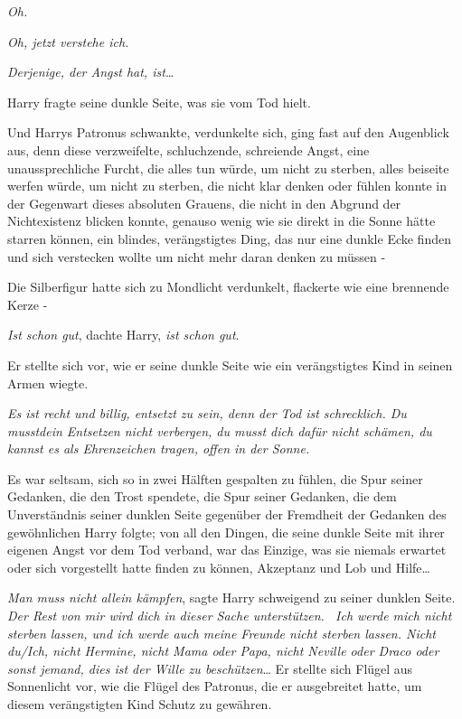 {\emph{\emph{Oh.}}

\emph{\emph{Oh, jetzt verstehe ich.}}

\emph{\emph{Derjenige, der Angst hat, ist…}}

Harry fragte seine dunkle Seite, was sie vom Tod hielt.

Und Harrys Patronus schwankte, verdunkelte sich, ging fast auf den Augenblick aus, denn diese verzweifelte, schluchzende, schreiende Angst, eine unaussprechliche Furcht, die alles tun würde, um nicht zu sterben, alles beiseite werfen würde, um nicht zu sterben, die nicht klar denken oder fühlen konnte in der Gegenwart dieses absoluten Grauens, die nicht in den Abgrund der Nichtexistenz blicken konnte, genauso wenig wie sie direkt in die Sonne hätte starren können, ein blindes, verängstigtes Ding, das nur eine dunkle Ecke finden und sich verstecken wollte um nicht mehr daran denken zu müssen -

Die Silberfigur hatte sich zu Mondlicht verdunkelt, flackerte wie eine brennende Kerze -

\emph{Ist schon gut}, dachte Harry, \emph{ist schon gut}.

Er stellte sich vor, wie er seine dunkle Seite wie ein verängstigtes Kind in seinen Armen wiegte.

\emph{\emph{Es ist recht und billig, entsetzt zu sein, denn der Tod ist schrecklich.} \emph{Du} \emph{musstdein Entsetzen nicht verbergen,} \emph{du musst dich dafür nicht schämen,} \emph{du kannst} \emph{es als Ehrenzeichen tragen, offen in der Sonne.}}

Es war seltsam, sich so in zwei Hälften gespalten zu fühlen, die Spur seiner Gedanken, die den Trost spendete, die Spur seiner Gedanken, die dem Unverständnis seiner dunklen Seite gegenüber der Fremdheit der Gedanken des gewöhnlichen Harry folgte; von all den Dingen, die seine dunkle Seite mit ihrer eigenen Angst vor dem Tod verband, war das Einzige, was sie niemals erwartet oder sich vorgestellt hatte finden zu können, Akzeptanz und Lob und Hilfe…

\emph{Man muss nicht allein kämpfen}, sagte Harry schweigend zu seiner dunklen Seite. \emph{Der Rest von mir wird dich in dieser Sache unterstützen. ~Ich werde mich nicht sterben lassen, und ich werde auch meine Freunde nicht sterben lassen. Nicht du/Ich, nicht Hermine, nicht Mama oder Papa, nicht Neville oder Draco oder sonst jemand, dies ist der Wille zu beschützen}… Er stellte sich Flügel aus Sonnenlicht vor, wie die Flügel des Patronus, die er ausgebreitet hatte, um diesem verängstigten Kind Schutz zu gewähren.

}

